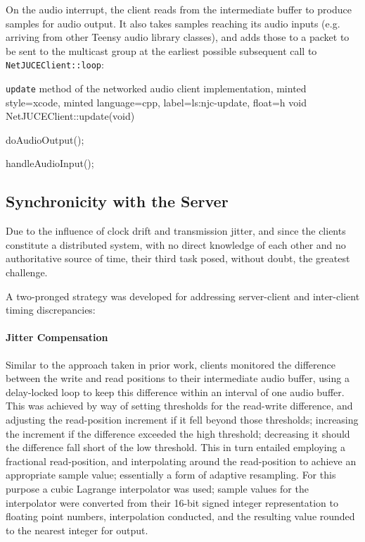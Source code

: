 On the audio interrupt, the client reads from the intermediate buffer to
produce samples for audio output.
It also takes samples reaching its audio inputs (e.g. arriving from other
Teensy audio library classes), and adds those to a packet to be sent to the
multicast group at the earliest possible subsequent call to
\texttt{NetJUCEClient::loop}:
\begin{codelisting}{
    \texttt{update} method of the networked audio client implementation,
    minted style=xcode,
    minted language=cpp,
    label=ls:njc-update,
    float=h
}
    void NetJUCEClient::update(void) {
        doAudioOutput();

        handleAudioInput();
    }
\end{codelisting}

\subsection{Synchronicity with the Server}\label{ss:client-sync}

Due to the influence of clock drift and transmission jitter, and since the
clients constitute a distributed system, with no direct knowledge of each other
and no authoritative source of time, their third task posed, without doubt,
the greatest challenge.

A two-pronged strategy was developed for addressing server-client and
inter-client timing discrepancies:

\paragraph{Jitter Compensation}
Similar to the approach taken in prior
work\cite{rushton_microcontroller-based_2023}, clients monitored the difference
between the write and read positions to their intermediate audio buffer,
using a delay-locked loop to keep this difference within an interval of one
audio buffer.
This was achieved by way of setting thresholds for the read-write difference,
and adjusting the read-position increment if it fell beyond those thresholds;
increasing the increment if the difference exceeded the high threshold;
decreasing it should the difference fall short of the low threshold.
This in turn entailed employing a fractional read-position, and interpolating
around the read-position to achieve an appropriate sample value; essentially
a form of adaptive resampling.
For this purpose a cubic Lagrange interpolator was used; sample values for the
interpolator were converted from their 16-bit signed integer representation
to floating point numbers, interpolation conducted, and the resulting value
rounded to the nearest integer for output.

